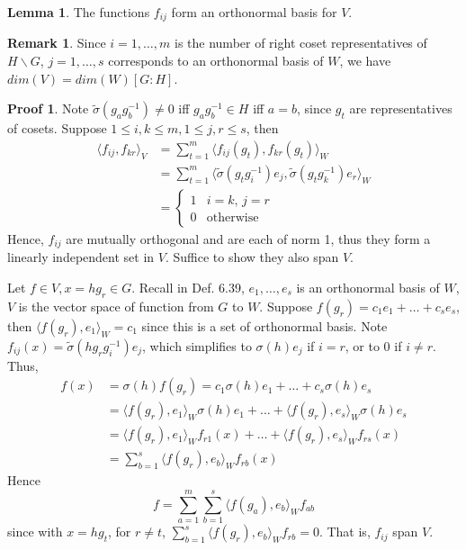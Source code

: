 \documentclass{book}
\newcommand{\inner}[1]{\langle #1 \rangle}
\theoremstyle{definition}
\newtheorem{lemma}{Lemma}[chapter]
\theoremstyle{remarkstyle}
\newtheorem*{remark}{Remark}%
\newtheorem*{myproof}{Proof}%
\begin{document}
\begin{lemma}
    The functions $f_{ij} $ form an orthonormal basis for $V$.
\end{lemma}
\begin{remark}
    Since $i=1,\dots,m$ is the number of right coset representatives of $H\backslash G$, $j=1,\dots, s$ corresponds to an orthonormal basis of $W$, we have $dim(V)=dim(W)[G:H]$.
\end{remark}
\begin{myproof}
    Note $\tilde{\sigma}(g_ag_b^{-1}) \neq 0$ iff $g_ag_b^{-1}\in H$ iff $a=b$, since $g_t$ are representatives of cosets. Suppose $1\le i, k\le m, 1\le j, r\le s$, then 
    \begin{align*}
        \inner{f_{ij},f_{kr}}_V 
        &= \sum^{m}_{t=1}\inner{f_{ij}(g_t),f_{kr}(g_t)}_W \\
        &= \sum^{m}_{t=1}\inner{\tilde{\sigma}(g_tg^{-1}_i)e_j,\tilde{\sigma}(g_tg^{-1}_k)e_r }_W \\
        &= \left\{ 
        \begin{array}{ll}
            1 & i=k,\, j=r  \\
            0 & \textrm{otherwise}
        \end{array}
        \right.
    \end{align*}
    Hence, $f_{ij} $ are mutually orthogonal and are each of norm 1, thus they form a linearly independent set in $V$. Suffice to show they also span $V$. \newline 

    Let $f\in V, x=hg_r\in G$. Recall in Def. 6.39, $e_1,\dots,e_s$ is an orthonormal basis of $W$, $V$ is the vector space of function from $G$ to $W$. Suppose $f(g_r)=c_1e_1+\dots+c_se_s$, then $\inner{f(g_r),e_1}_W=c_1$ since this is a set of orthonormal basis. Note $f_{ij}(x) = \tilde{\sigma}(hg_rg^{-1}_i)e_j$, which simplifies to $\sigma(h)e_j$ if $i=r$, or to 0 if $i\neq r$. Thus,
    \begin{align*}
        f(x) &= \sigma(h)f(g_r) = c_1\sigma(h)e_1 + \dots + c_s\sigma(h)e_s \\
        &= \inner{f(g_r),e_1}_W\sigma(h)e_1 + \dots + \inner{f(g_r),e_s}_W\sigma(h)e_s \\
        &= \inner{f(g_r),e_1}_Wf_{r1}(x) + \dots + \inner{f(g_r),e_s}_Wf_{rs}(x) \\
        &= \sum_{b=1}^{s}\inner{f(g_r),e_b}_Wf_{rb}(x)
    \end{align*}
    Hence 
    $$
    f = \sum_{a=1}^m\sum^s_{b=1}\inner{f(g_a),e_b}_Wf_{ab}
    $$
    since with $x=hg_t$, for $r\neq t$, $\sum_{b=1}^{s}\inner{f(g_r),e_b}_Wf_{rb}=0$. That is, $f_{ij} $ span $V$. \newline
\end{myproof}
\end{document}
